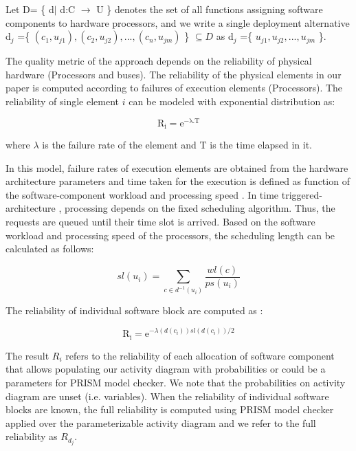 \documentclass[3p,times,procedia,authoryear,round]{elsarticle}
\begin{document}
Let D= \{ d$|$ d:C $\rightarrow$ U \} denotes the set of  all functions assigning software components to hardware processors, and we write a single deployment alternative d$_{j}$ =\{ $(c_{1},u_{j1}), (c_{2},u_{j2}),..., (c_{n},u_{jm})$ \} $\subseteq D$ as  d$_{j}$ =\{ $u_{j1}, u_{j2},..., u_{jm}$ \}.





The quality metric of the approach depends on the reliability of physical hardware (Processors and buses). The reliability of the physical elements in our paper is computed according to failures of execution elements (Processors). The reliability of single element $i$  \citep{Meedeniya2011835} can be modeled with exponential distribution as: 

\begin{equation}
\label{eq1}
\mathrm{R_{i} = e ^{- \lambda . T}}
\end{equation}

where $\lambda$ is the failure rate of the element and T is the time elapsed in it.

In this model, failure rates of execution elements are obtained from the hardware architecture parameters and time taken for the execution is defined as function of the software-component workload and processing speed \citep{Meedeniya2011835}. In time triggered-architecture \citep{HeinerT98}, processing  depends on the fixed scheduling algorithm. Thus, the requests are queued until their time slot is arrived. Based on the software workload and processing speed of the processors, the scheduling length can be calculated as follows:

\begin{equation} sl(u_{i})= \sum_{c\in d^{-1}(u_{i})} \frac{wl(c)}{ps(u_{i})}\end{equation}

The reliability of individual software block are computed as :


\begin{equation}
\label{eq2}
\mathrm{R_{i} =  e} ^{- \lambda(d(c_{i})) sl(d(c_{i}))/2}
\end{equation}


The result $R_{i}$ refers to the reliability of each allocation of software component that allows populating our activity diagram with probabilities or could be a parameters for PRISM model checker. We note that the probabilities on activity diagram are unset (i.e. variables). When the reliability of individual software blocks are known, the full reliability is computed using PRISM model checker applied over the parameterizable activity diagram and we refer to the full reliability as $R_{d_{j}}$. 
\end{document}
